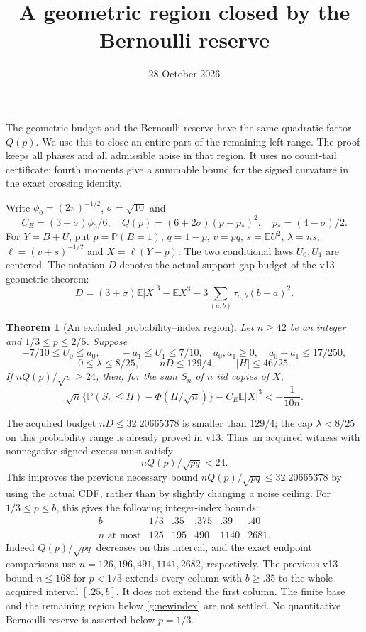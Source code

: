 \documentclass[11pt]{article}
\title{A geometric region closed by the Bernoulli reserve}
\author{}\date{28 October 2026}
\newcommand{\E}{\mathbb E}\newcommand{\Pp}{\mathbb P}
\newtheorem{theorem}{Theorem}\newtheorem{lemma}[theorem]{Lemma}
\begin{document}
\maketitle

The geometric budget and the Bernoulli reserve have the same quadratic
factor $Q(p)$. We use this to close an entire part of the remaining left
range. The proof keeps all phases and all admissible noise in that region.
It uses no count-tail certificate: fourth moments give a summable bound
for the signed curvature in the exact crossing identity.

Write $\phi_0=(2\pi)^{-1/2}$, $\sigma=\sqrt{10}$ and
\[
 C_E=(3+\sigma)\phi_0/6,\quad
 Q(p)=(6+2\sigma)(p-p_*)^2,\quad p_*=(4-\sigma)/2.
\]
For $Y=B+U$, put $p=\Pp(B=1)$, $q=1-p$, $v=pq$,
$s=\E U^2$, $\lambda=ns$, $\ell=(v+s)^{-1/2}$ and $X=\ell(Y-p)$.
The two conditional laws $U_0,U_1$ are centered. The notation $D$ denotes
the actual support-gap budget of the v13 geometric theorem:
\[
 D=(3+\sigma)\E|X|^3-\E X^3-3\sum_{(a,b)}\tau_{a,b}(b-a)^2.
\]

\begin{theorem}[An excluded probability--index region]\label{g:main}
Let $n\ge42$ be an integer and $1/3\le p\le2/5$. Suppose
\[
 -7/10\le U_0\le a_0,\qquad -a_1\le U_1\le7/10,
 \quad a_0,a_1\ge0,\quad a_0+a_1\le17/250,
\]
\[
 0\le\lambda\le8/25,\qquad nD\le129/4,\qquad |H|\le46/25.
\]
If $nQ(p)/\sqrt v\ge24$, then, for the sum $S_n$ of $n$ iid copies of $X$,
\[
 \sqrt n\{\Pp(S_n\le H)-\Phi(H/\sqrt n)\}
                  -C_E\E|X|^3<-\frac1{10n}.
\]
\end{theorem}

The acquired budget $nD\le32.20665378$ is smaller than $129/4$;
the cap $\lambda<8/25$ on this probability range is already proved in
v13. Thus an acquired witness with nonnegative signed excess must satisfy
\begin{equation}\label{g:newindex}
                         nQ(p)/\sqrt{pq}<24.
\end{equation}
This improves the previous necessary bound $nQ(p)/\sqrt{pq}\le32.20665378$
by using the actual CDF, rather than by slightly changing a noise ceiling.
For $1/3\le p\le b$, this gives the following integer-index bounds:
\[
\begin{array}{c|ccccc}
 b&1/3&.35&.375&.39&.40\\\hline
 n\text{ at most}&125&195&490&1140&2681.
\end{array}
\]
Indeed $Q(p)/\sqrt{pq}$ decreases on this interval, and the exact endpoint
comparisons use $n=126,196,491,1141,2682$, respectively. The previous v13
bound $n\le168$ for $p<1/3$ extends every column with $b\ge.35$ to the
whole acquired interval $[.25,b]$. It does not extend the first column.
The finite base and the remaining region below \eqref{g:newindex} are not
settled. No quantitative Bernoulli reserve is asserted below $p=1/3$.
\end{document}
